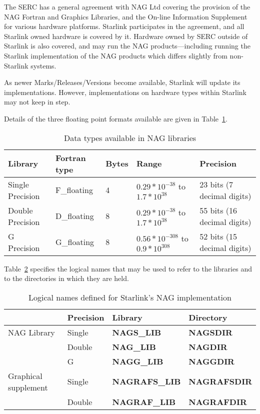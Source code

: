 The SERC has a general agreement with NAG Ltd covering the provision of the
NAG Fortran and Graphics Libraries, and the On-line Information Supplement for
various hardware platforms. Starlink participates in the agreement, and all
Starlink owned hardware is covered by it. Hardware owned by SERC outside of
Starlink is also covered, and may run the NAG products---including running the
Starlink implementation of the NAG products which differs slightly from
non-Starlink systems.

As newer Marks/Releases/Versions become available, Starlink will update its
implementations. However, implementations on hardware types within Starlink may
not keep in step.

Details of the three floating point formats available are given in
Table~\ref{tab:types}.

\begin{small}
\begin{table}[h]
\begin{center}
\begin{tabular}{|l|l|l|l|l|}
\hline
Library & Fortran type & Bytes & Range & Precision \\
\hline
Single Precision & F\_floating & 4 & $0.29 * 10^{-38}$ to $1.7 * 10^{38}$ &
 23 bits (7 decimal digits) \\
Double Precision & D\_floating & 8 & $0.29 * 10^{-38}$ to $1.7 * 10^{38}$ &
 55 bits (16 decimal digits) \\
G Precision & G\_floating & 8 & $0.56 * 10^{-308}$ to $0.9 * 10^{308}$ &
 52 bits (15 decimal digits) \\
\hline
\end{tabular}
\caption{Data types available in NAG libraries}
\label{tab:types}
\end{center}
\end{table}
\end{small}

Table~\ref{tab:logs} specifies the logical names that may be used to refer
to the libraries and to the directories in which they are held.

\begin{table}
\begin{center}
\begin{tabular}{|l|l|l|l|}
\hline
                     & Precision & Library            & Directory        \\
\hline
NAG Library          & Single    & {\bf NAGS\_LIB}    & {\bf NAGSDIR}    \\
                     & Double    & {\bf NAG\_LIB}     & {\bf NAGDIR}     \\
                     & G         & {\bf NAGG\_LIB}    & {\bf NAGGDIR}    \\
\hline
Graphical supplement & Single    & {\bf NAGRAFS\_LIB} & {\bf NAGRAFSDIR} \\
                     & Double    & {\bf NAGRAF\_LIB}  & {\bf NAGRAFDIR}  \\
\hline
\end{tabular}
\caption{Logical names defined for Starlink's NAG implementation}
\label{tab:logs}
\end{center}
\end{table}


